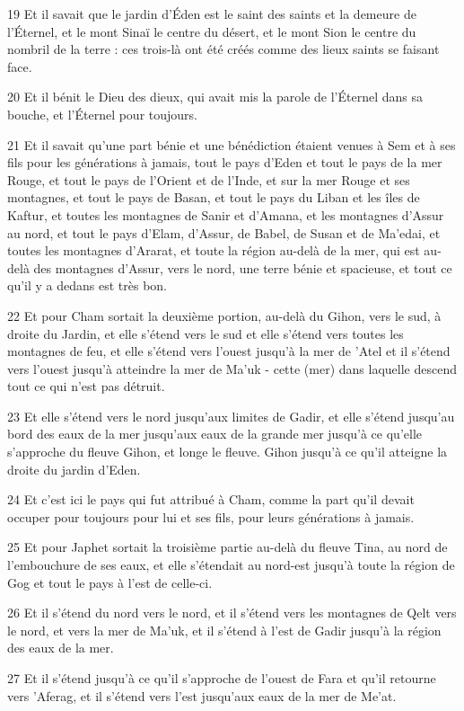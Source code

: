 \par 19 Et il savait que le jardin d'Éden est le saint des saints et la demeure de l'Éternel, et le mont Sinaï le centre du désert, et le mont Sion le centre du nombril de la terre : ces trois-là ont été créés comme des lieux saints se faisant face.
\par 20 Et il bénit le Dieu des dieux, qui avait mis la parole de l'Éternel dans sa bouche, et l'Éternel pour toujours.
\par 21 Et il savait qu'une part bénie et une bénédiction étaient venues à Sem et à ses fils pour les générations à jamais, tout le pays d'Eden et tout le pays de la mer Rouge, et tout le pays de l'Orient et de l'Inde, et sur la mer Rouge et ses montagnes, et tout le pays de Basan, et tout le pays du Liban et les îles de Kaftur, et toutes les montagnes de Sanir et d'Amana, et les montagnes d'Assur au nord, et tout le pays d'Elam, d'Assur, de Babel, de Susan et de Ma'edai, et toutes les montagnes d'Ararat, et toute la région au-delà de la mer, qui est au-delà des montagnes d'Assur, vers le nord, une terre bénie et spacieuse, et tout ce qu'il y a dedans est très bon.
\par 22 Et pour Cham sortait la deuxième portion, au-delà du Gihon, vers le sud, à droite du Jardin, et elle s'étend vers le sud et elle s'étend vers toutes les montagnes de feu, et elle s'étend vers l'ouest jusqu'à la mer de 'Atel et il s'étend vers l'ouest jusqu'à atteindre la mer de Ma'uk - cette (mer) dans laquelle descend tout ce qui n'est pas détruit.
\par 23 Et elle s'étend vers le nord jusqu'aux limites de Gadir, et elle s'étend jusqu'au bord des eaux de la mer jusqu'aux eaux de la grande mer jusqu'à ce qu'elle s'approche du fleuve Gihon, et longe le fleuve. Gihon jusqu'à ce qu'il atteigne la droite du jardin d'Eden.
\par 24 Et c'est ici le pays qui fut attribué à Cham, comme la part qu'il devait occuper pour toujours pour lui et ses fils, pour leurs générations à jamais.
\par 25 Et pour Japhet sortait la troisième partie au-delà du fleuve Tina, au nord de l'embouchure de ses eaux, et elle s'étendait au nord-est jusqu'à toute la région de Gog et tout le pays à l'est de celle-ci.
\par 26 Et il s'étend du nord vers le nord, et il s'étend vers les montagnes de Qelt vers le nord, et vers la mer de Ma'uk, et il s'étend à l'est de Gadir jusqu'à la région des eaux de la mer.
\par 27 Et il s'étend jusqu'à ce qu'il s'approche de l'ouest de Fara et qu'il retourne vers 'Aferag, et il s'étend vers l'est jusqu'aux eaux de la mer de Me'at.
